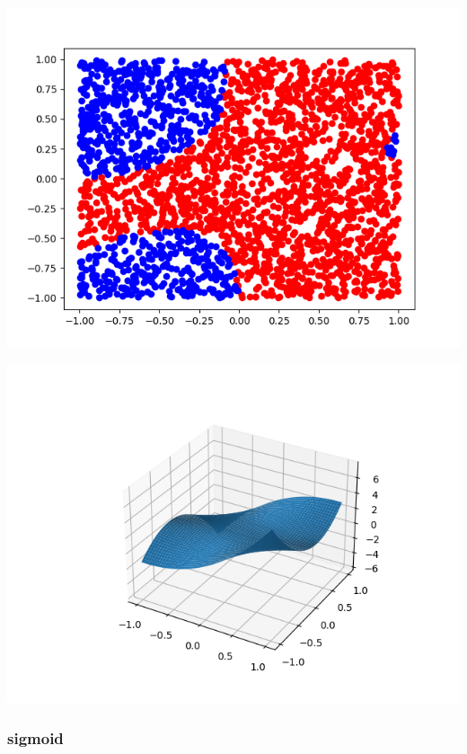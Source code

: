 \documentclass[11pt]{article}
\begin{document}
\begin{center}
\includegraphics[scale=0.7]{./res/ac_points_poly_0.25.png}
\end{center}

\begin{center}
\includegraphics[scale=0.7]{./res/ac_surface_poly_0.25.png}
\end{center}

\subsubsection*{sigmoid}
\label{sec:orga0f27a3}
\end{document}
